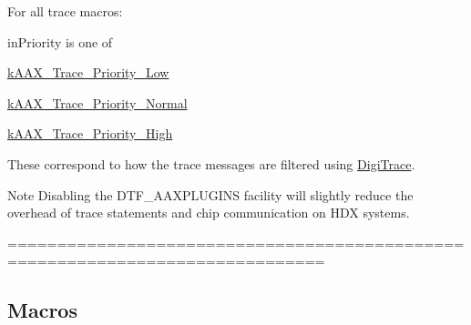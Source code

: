 For all trace macros\+:

{\ttfamily in\+Priority} is one of \begin{DoxyItemize}
\item \hyperlink{a00158_abd6b80f2e0a26581086b21b7e7ad0ce9}{k\+A\+A\+X\+\_\+\+Trace\+\_\+\+Priority\+\_\+\+Low} \item \hyperlink{a00158_a8a6953f26f36747357d5d95f96dcf68d}{k\+A\+A\+X\+\_\+\+Trace\+\_\+\+Priority\+\_\+\+Normal} \item \hyperlink{a00158_a5edd9a4ac559a4ef99a948c2ebd422db}{k\+A\+A\+X\+\_\+\+Trace\+\_\+\+Priority\+\_\+\+High}\end{DoxyItemize}
These correspond to how the trace messages are filtered using \hyperlink{a00364}{Digi\+Trace}.

\begin{DoxyNote}{Note}
Disabling the {\ttfamily D\+T\+F\+\_\+\+A\+A\+X\+P\+L\+U\+G\+I\+N\+S} facility will slightly reduce the overhead of trace statements and chip communication on H\+D\+X systems.
\end{DoxyNote}
============================================================================== \subsection*{Macros}
